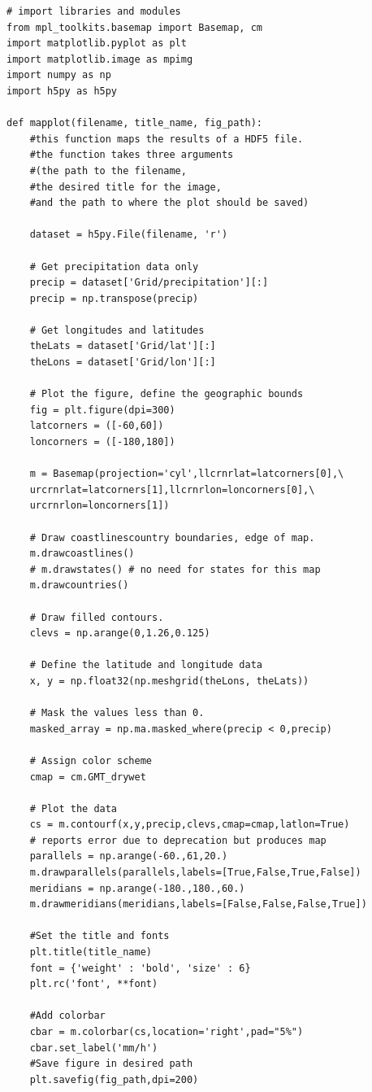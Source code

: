 \documentclass[12pt]{article}
\begin{document}
\lstset{language=Python, basicstyle=\footnotesize\ttfamily}  
\begin{lstlisting}[frame=single]
# import libraries and modules
from mpl_toolkits.basemap import Basemap, cm
import matplotlib.pyplot as plt
import matplotlib.image as mpimg
import numpy as np
import h5py as h5py

def mapplot(filename, title_name, fig_path):
    #this function maps the results of a HDF5 file. 
    #the function takes three arguments 
    #(the path to the filename, 
    #the desired title for the image, 
    #and the path to where the plot should be saved)

    dataset = h5py.File(filename, 'r') 
    
    # Get precipitation data only
    precip = dataset['Grid/precipitation'][:]
    precip = np.transpose(precip)

    # Get longitudes and latitudes
    theLats = dataset['Grid/lat'][:]
    theLons = dataset['Grid/lon'][:]

    # Plot the figure, define the geographic bounds
    fig = plt.figure(dpi=300)
    latcorners = ([-60,60])
    loncorners = ([-180,180])

    m = Basemap(projection='cyl',llcrnrlat=latcorners[0],\
	urcrnrlat=latcorners[1],llcrnrlon=loncorners[0],\
	urcrnrlon=loncorners[1])

    # Draw coastlinescountry boundaries, edge of map.
    m.drawcoastlines()
    # m.drawstates() # no need for states for this map
    m.drawcountries()

    # Draw filled contours.
    clevs = np.arange(0,1.26,0.125)

    # Define the latitude and longitude data
    x, y = np.float32(np.meshgrid(theLons, theLats))

    # Mask the values less than 0.
    masked_array = np.ma.masked_where(precip < 0,precip) 

    # Assign color scheme
    cmap = cm.GMT_drywet

    # Plot the data
    cs = m.contourf(x,y,precip,clevs,cmap=cmap,latlon=True) 
	# reports error due to deprecation but produces map
    parallels = np.arange(-60.,61,20.)
    m.drawparallels(parallels,labels=[True,False,True,False])
    meridians = np.arange(-180.,180.,60.)
    m.drawmeridians(meridians,labels=[False,False,False,True])

    #Set the title and fonts
    plt.title(title_name)
    font = {'weight' : 'bold', 'size' : 6}
    plt.rc('font', **font)

    #Add colorbar
    cbar = m.colorbar(cs,location='right',pad="5%")
    cbar.set_label('mm/h')
    #Save figure in desired path
    plt.savefig(fig_path,dpi=200) 

\end{lstlisting}
\end{document}
